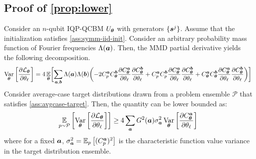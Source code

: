 \documentclass[10pt, twocolumn, a4paper]{article}
\theoremstyle{plain}
\theoremstyle{definition}
\theoremstyle{remark}
\begin{document}
\subsection{Proof of \cref{prop:lower}}
Consider an $n$-qubit IQP-QCBM $U_{\bm{\theta}}$ with generators $\{{\bm{s}^j}\}$. Assume that the initialization satisfies \cref{ass:symm-iid-init}. Consider an arbitrary probability mass function of Fourier frequencies $\Lambda({\bm{a}})$. Then, the MMD partial derivative yields the following decomposition.
\begin{equation}
\operatorname*{Var}_{{\bm{\theta}}} \left[ \frac{\partial \mathcal{L}_{\bm{\theta}}}{\partial \theta_\ell} \right] = 4 \operatorname*{\mathbb{E}}_{{\bm{\theta}}} \biggl[ \sum_{{\bm{a}}, {\bm{b}}} \Lambda({\bm{a}}) \Lambda({\bm{b}}) \biggl( \nonumber - 2C^{\bm{a}}_p C_{\bm{\theta}}^{\bm{b}} \frac{\partial C_{\bm{\theta}}^{\bm{a}}}{\partial \theta_\ell} \frac{\partial C_{\bm{\theta}}^{\bm{b}}}{\partial \theta_\ell} + 
 C^{\bm{a}}_p C^{\bm{b}}_p \frac{\partial C_{\bm{\theta}}^{\bm{a}}}{\partial \theta_\ell} \frac{\partial C_{\bm{\theta}}^{\bm{b}}}{\partial \theta_\ell} + C_{\bm{\theta}}^{\bm{a}} C_{\bm{\theta}}^{\bm{b}} \frac{\partial C_{\bm{\theta}}^{\bm{a}}}{\partial \theta_\ell} \frac{\partial C_{\bm{\theta}}^{\bm{b}}}{\partial \theta_\ell} \biggr) \biggr]
\end{equation}
Consider average-case target distributions drawn from a problem ensemble $\mathcal{P}$ that satisfies \cref{ass:avgcase-target}. Then, the quantity can be lower bounded as:
\begin{equation}
\operatorname*{\mathbb{E}}_{p\sim\mathcal{P}} \left[\operatorname*{Var}_{{\bm{\theta}}} \left[ \frac{\partial \mathcal{L}_{\bm{\theta}}}{\partial \theta_\ell} \right]\right] \geq
4 \sum_{\bm{a}} G^2({\bm{a}})\sigma_{\bm{a}}^2\operatorname*{Var}_{{\bm{\theta}}} \left[ \frac{\partial C^{\bm{a}}_{\bm{\theta}}}{\partial \theta_\ell} \right]
\end{equation}
where for a fixed ${\bm{a}}$, $\sigma_{\bm{a}}^2 =\operatorname*{\mathbb {E}}_{p}\left[(C_p^{{\bm{a}}})^2\right]$ is the characteristic function value variance in the target distribution ensemble.
\end{document}
